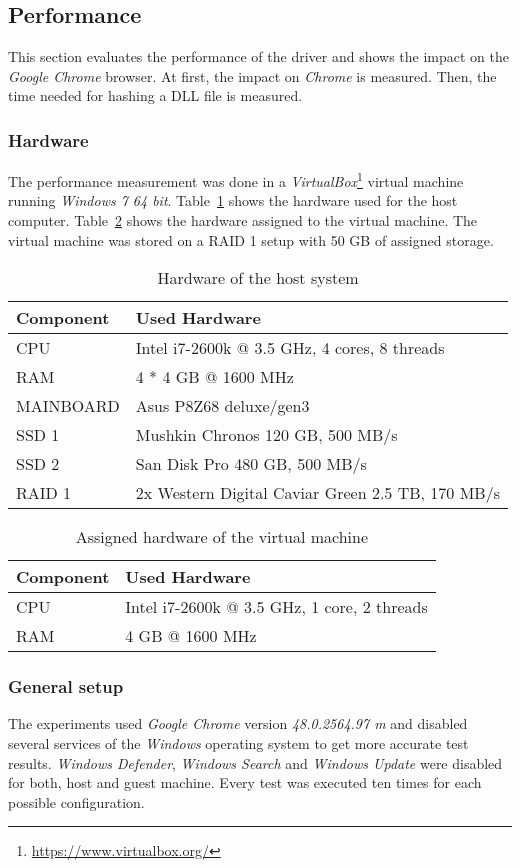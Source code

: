 \subsection{Performance}
\label{sec:performance}
This section evaluates the performance of the driver and shows the impact on the \emph{Google Chrome} browser. At first, the impact on \emph{Chrome} is measured. Then, the time needed for hashing a \gls{DLL} file is measured.

\subsubsection{Hardware}
The performance measurement was done in a \emph{VirtualBox}\footnote{\url{https://www.virtualbox.org/}} virtual machine running \emph{Windows 7 64 bit}. Table~\ref{fig:hardware_host} shows the hardware used for the host computer. Table~\ref{fig:hardware_vm} shows the hardware assigned to the virtual machine. The virtual machine was stored on a RAID 1 setup with 50 GB of assigned storage. 
\begin{table}
\centering
\caption{Hardware of the host system}
\label{fig:hardware_host}
\begin{tabularx}{\textwidth}{|l|X|}
\hline
Component & Used Hardware \\ \hline
CPU & Intel i7-2600k @ 3.5 GHz, 4 cores, 8 threads \\ \hline
RAM & 4 * 4 GB @ 1600 MHz \\ \hline
MAINBOARD & Asus P8Z68 deluxe/gen3 \\ \hline
SSD 1 & Mushkin Chronos 120 GB, 500 MB/s \\ \hline
SSD 2 & San Disk Pro 480 GB, 500 MB/s \\ \hline
RAID 1 & 2x Western Digital Caviar Green 2.5 TB, 170 MB/s \\ \hline
\end{tabularx}
\end{table}
\begin{table}
\centering
\caption{Assigned hardware of the virtual machine}
\label{fig:hardware_vm}
\begin{tabularx}{\textwidth}{|l|X|}
\hline
Component & Used Hardware \\ \hline
CPU & Intel i7-2600k @ 3.5 GHz, 1 core, 2 threads \\ \hline
RAM & 4 GB @ 1600 MHz \\ \hline
\end{tabularx}
\end{table}

\subsubsection{General setup}
The experiments used \emph{Google Chrome} version \emph{48.0.2564.97 m} and disabled several services of the \emph{Windows} operating system to get more accurate test results. \emph{Windows Defender}, \emph{Windows Search} and \emph{Windows Update} were disabled for both, host and guest machine. Every test was executed ten times for each possible configuration.


\clearpage

\clearpage
